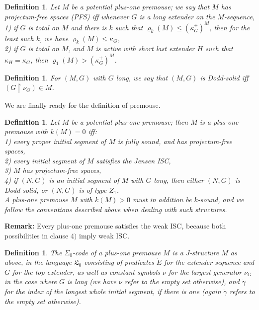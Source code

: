 \documentclass[12pt]{article}
\newtheorem{defn}[thm]{Definition}
\begin{document}
\begin{defn} \label{PFS}
Let $M$ be a potential plus-one premouse; we say that $M$ has projectum-free spaces (PFS) iff whenever $G$ is a long extender on the $M$-sequence,\\

	1) if $G$ is total on $M$ and there is $k$ such that $\varrho_k (M) \leq (\kappa_G ^+)^M$, then for the least such $ k$, we have $\varrho_k (M ) \leq \kappa_G$,\\
	
	2) if $G$ is total on $M$, and $M$ is active with short last extender $H$ such that $\kappa_H = \kappa_G$, then $\varrho_1 (M) > (\kappa_G ^+ ) ^M$.
\end{defn}

\begin{defn} \label{Dodd-solid PIPM} 
For $(M, G)$ with $G$ long, we say that $(M, G)$ is Dodd-solid iff $(G \restriction \nu_G ) \in M$.
\end{defn}


We are finally ready for the definition of premouse.\\


\begin{defn} \label{premouse}
Let $M$ be a potential plus-one premouse; then $M$ is a plus-one premouse with $k(M) = 0$ iff:\\
	
	1) every proper initial segment of $M$ is fully sound, and has projectum-free spaces,\\
	
	2) every initial segment of $M$ satisfies the Jensen ISC,\\
	
	3) $M$ has projectum-free spaces,\\
	
	4) if $(N, G)$ is an initial segment of $M$ with $G$ long, then either $(N, G)$ is Dodd-solid, or $(N, G)$ is of type $Z_1$.\\
	
	A plus-one premouse $M$ with $k(M) > 0$ must in addition be $k$-sound, and we follow the conventions described above when dealing with such structures.
\end{defn}
	
\textbf{Remark:}  Every plus-one premouse satisfies the weak ISC, because both possibilities in clause $4)$ imply weak ISC.\\




\begin{defn}
The $\Sigma_0$-code of a plus-one premouse $M$ is a J-structure $M$ as above, in the language $\mathfrak{L}_0$  consisting of predicates $\dot{E}$ for the extender sequence and $\dot{G}$ for the top extender, as well as constant symbols $\dot{\nu}$ for the largest generator $\nu_G$ in the case where $G$ is long (we have $\dot{\nu}$ refer to the empty set otherwise), and $\dot{\gamma}$ for the index of the longest whole initial segment, if there is one (again $\dot{\gamma}$ refers to the empty set otherwise).
\end{defn}
\end{document}
